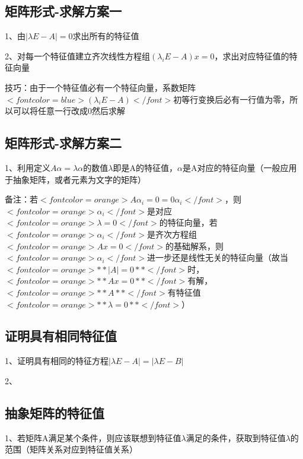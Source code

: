 \subsection{矩阵形式-求解方案一}

1、由$ |\lambda E - A|=0 $求出所有的特征值

2、对每一个特征值建立齐次线性方程组$ (\lambda _i E - A)x = 0 $，求出对应特征值的特征向量

技巧：由于一个特征值必有一个特征向量，系数矩阵$ <font color=blue>(\lambda _i E - A)</font> $初等行变换后必有一行值为零，所以可以将任意一行改成0然后求解



\subsection{矩阵形式-求解方案二}

1、利用定义$ A\alpha=\lambda \alpha $的数值$ \lambda $即是A的特征值，$ \alpha $是A对应的特征向量（一般应用于抽象矩阵，或者元素为文字的矩阵）

备注：若$ <font color=orange>A\alpha_i=0=0\alpha_i</font> $，则$ <font color=orange>\alpha_i</font> $是对应$ <font color=orange>\lambda=0</font> $的特征向量，若$ <font color=orange>\alpha_i</font> $是齐次方程组$ <font color=orange>Ax=0</font> $的基础解系，则$ <font color=orange>\alpha_i</font> $进一步还是线性无关的特征向量（故当$ <font color=orange>**|A|=0**</font> $时，$ <font color=orange>**Ax=0**</font> $有解，$ <font color=orange>**A**</font> $有特征值$ <font color=orange>**\lambda=0**</font> $）



\subsection{证明具有相同特征值}

1、证明具有相同的特征方程$ |\lambda E-A|=|\lambda E-B| $

2、



\subsection{抽象矩阵的特征值}

1、若矩阵A满足某个条件，则应该联想到特征值$ \lambda $满足的条件，获取到特征值$ \lambda $的范围（矩阵关系对应到特征值关系）

